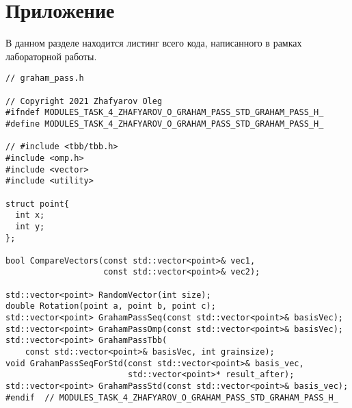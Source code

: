 \documentclass{report}
\begin{document}
\section*{Приложение}
В данном разделе находится листинг всего кода, написанного в рамках лабораторной работы.
\begin{lstlisting}
// graham_pass.h

// Copyright 2021 Zhafyarov Oleg
#ifndef MODULES_TASK_4_ZHAFYAROV_O_GRAHAM_PASS_STD_GRAHAM_PASS_H_
#define MODULES_TASK_4_ZHAFYAROV_O_GRAHAM_PASS_STD_GRAHAM_PASS_H_

// #include <tbb/tbb.h>
#include <omp.h>
#include <vector>
#include <utility>

struct point{
  int x;
  int y;
};

bool CompareVectors(const std::vector<point>& vec1,
                    const std::vector<point>& vec2);
                    
std::vector<point> RandomVector(int size);
double Rotation(point a, point b, point c);
std::vector<point> GrahamPassSeq(const std::vector<point>& basisVec);
std::vector<point> GrahamPassOmp(const std::vector<point>& basisVec);
std::vector<point> GrahamPassTbb(
    const std::vector<point>& basisVec, int grainsize);
void GrahamPassSeqForStd(const std::vector<point>& basis_vec,
                         std::vector<point>* result_after);
std::vector<point> GrahamPassStd(const std::vector<point>& basis_vec);
#endif  // MODULES_TASK_4_ZHAFYAROV_O_GRAHAM_PASS_STD_GRAHAM_PASS_H_
\end{lstlisting}
\end{document}
